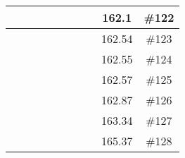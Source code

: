 \begin{center}
\begin{longtable}{|c|c|c|c|c|c|c|c|c|c|}
 \x &  \x &  &  \x &  &  &  \x &  \x & 162.1 & \#122 \\ \hline
 \x &  &  \x &  &  \x &  &  \x &  & 162.54 & \#123 \\ \hline
 \x &  \x &  &  \x &  \x &  &  &  & 162.55 & \#124 \\ \hline
 \x &  &  &  \x &  &  \x &  \x &  \x & 162.57 & \#125 \\ \hline
 \x &  &  &  \x &  \x &  &  &  & 162.87 & \#126 \\ \hline
 \x &  &  &  \x &  \x &  &  \x &  & 163.34 & \#127 \\ \hline
 \x &  &  \x &  \x &  \x &  \x &  &  & 165.37 & \#128 \\ \hline
\end{longtable}
\label{table:windProdInputParams}
\end{center}
\normalsize